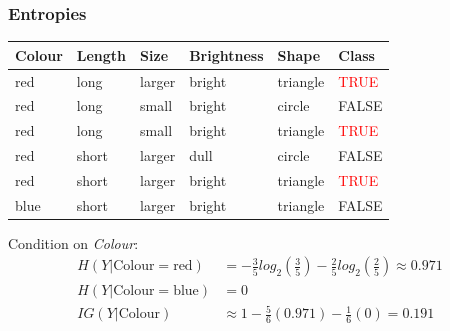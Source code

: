 \documentclass[aspectratio=169, 10pt]{beamer}
\begin{document}
\begin{frame}
    \frametitle{Entropies}
    \small

    \begin{table}[]
        \begin{tabular}{lllll|l}
        Colour & Length & Size & Brightness & Shape & Class \\ \hline
        \rowcolor{lightgray} red & long & larger & bright & triangle & \textcolor{red}{TRUE} \\
        \rowcolor{lightgray} red & long & small & bright & circle & FALSE \\
        \rowcolor{lightgray} red & long & small & bright & triangle & \textcolor{red}{TRUE} \\
        \rowcolor{lightgray} red & short & larger & dull & circle & FALSE \\
        \rowcolor{lightgray} red & short & larger & bright & triangle & \textcolor{red}{TRUE} \\
        blue & short & larger & bright & triangle & FALSE
        \end{tabular}
    \end{table}
    
    Condition on \textit{Colour}:
    \[
        \begin{split}
            H(Y|\text{Colour}=\text{red}) & = -\frac{3}{5} log_2(\frac{3}{5}) -\frac{2}{5} log_2(\frac{2}{5}) \approx 0.971 \\
            H(Y|\text{Colour}=\text{blue}) & = 0 \\
            IG(Y|\text{Colour}) & \approx 1 - \frac{5}{6}(0.971) - \frac{1}{6}(0) = 0.191
        \end{split}
    \]
\end{frame}
\end{document}
